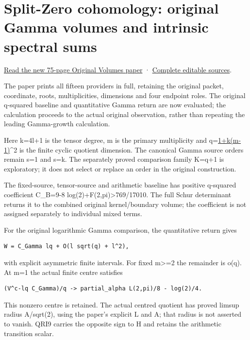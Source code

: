 \documentclass[
]{article}
\begin{document}
\section{Split-Zero cohomology: original Gamma volumes and intrinsic
spectral
sums}\label{split-zero-cohomology-original-gamma-volumes-and-intrinsic-spectral-sums-1}

\href{workbenches/splitzero-tandem/continuations/20260914-original-volumes/Original_Gamma_Volumes_and_Intrinsic_Spectral_Sums.pdf}{Read
the new 75-page Original Volumes paper} ·
\href{workbenches/splitzero-tandem/continuations/20260914-original-volumes/README.md}{Complete
editable sources}.

The paper prints all fifteen providers in full, retaining the original
packet, coordinate, roots, multiplicities, dimensions and four endpoint
roles. The original q-squared baseline and quantitative Gamma return are
now evaluated; the calculation proceeds to the actual original
observation, rather than repeating the leading Gamma-growth calculation.

Here k=4l+1 is the tensor degree, m is the primary multiplicity and
q=\href{k+1}{1+k(m-1)}\^{}2 is the finite cyclic quotient dimension. The
canonical Gamma source orders remain s=1 and s=k. The separately proved
comparison family K=q+1 is exploratory; it does not select or replace an
order in the original construction.

The fixed-source, tensor-source and arithmetic baseline has positive
q-squared coefficient C\_B=9-8 log(2)+F(2,pi)\textgreater769/17010. The
full Schur determinant returns it to the combined original
kernel/boundary volume; the coefficient is not assigned separately to
individual mixed terms.

For the original logarithmic Gamma comparison, the quantitative return
gives

\begin{verbatim}
W = C_Gamma lq + O(l sqrt(q) + l^2),
\end{verbatim}

with explicit asymmetric finite intervals. For fixed m\textgreater=2 the
remainder is o(q). At m=1 the actual finite centre satisfies

\begin{verbatim}
(V^c-lq C_Gamma)/q -> partial_alpha L(2,pi)/8 - log(2)/4.
\end{verbatim}

This nonzero centre is retained. The actual centred quotient has proved
limsup radius A/sqrt(2), using the paper's explicit L and A; that radius
is not asserted to vanish. QRI9 carries the opposite sign to H and
retains the arithmetic transition scalar.
\end{document}
